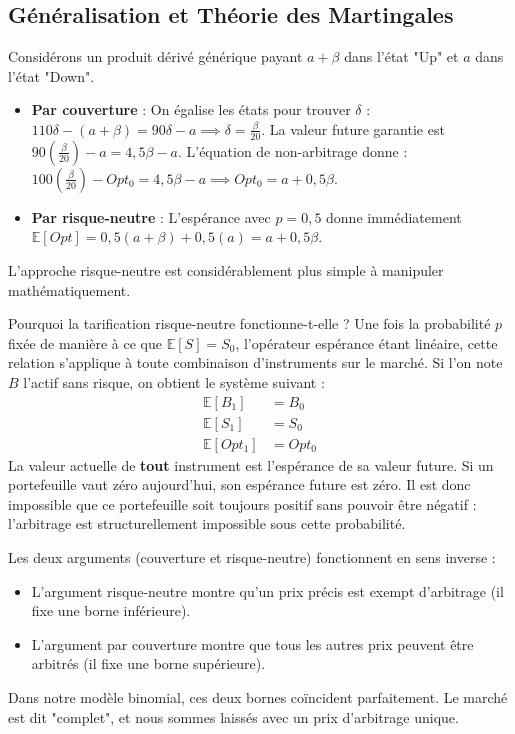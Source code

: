 \subsection{Généralisation et Théorie des Martingales}

\begin{examplebox}
Considérons un produit dérivé générique payant $a + \beta$ dans l'état "Up" et $a$ dans l'état "Down".
\begin{itemize}[label=$\rightarrow$]
    \item \textbf{Par couverture} : On égalise les états pour trouver $\delta$ : $110\delta - (a + \beta) = 90\delta - a \implies \delta = \frac{\beta}{20}$. La valeur future garantie est $90(\frac{\beta}{20}) - a = 4,5\beta - a$. L'équation de non-arbitrage donne : $100(\frac{\beta}{20}) - Opt_0 = 4,5\beta - a \implies Opt_0 = a + 0,5\beta$.
    \item \textbf{Par risque-neutre} : L'espérance avec $p=0,5$ donne immédiatement $\mathbb{E}[Opt] = 0,5(a + \beta) + 0,5(a) = a + 0,5\beta$.
\end{itemize}
L'approche risque-neutre est considérablement plus simple à manipuler mathématiquement.
\end{examplebox}

\begin{theorembox}
Pourquoi la tarification risque-neutre fonctionne-t-elle ? Une fois la probabilité $p$ fixée de manière à ce que $\mathbb{E}[S] = S_0$, l'opérateur espérance étant linéaire, cette relation s'applique à toute combinaison d'instruments sur le marché.
Si l'on note $B$ l'actif sans risque, on obtient le système suivant :
\begin{align*}
    \mathbb{E}[B_1] &= B_0 \\
    \mathbb{E}[S_1] &= S_0 \\
    \mathbb{E}[Opt_1] &= Opt_0
\end{align*}
La valeur actuelle de \textbf{tout} instrument est l'espérance de sa valeur future. Si un portefeuille vaut zéro aujourd'hui, son espérance future est zéro. Il est donc impossible que ce portefeuille soit toujours positif sans pouvoir être négatif : l'arbitrage est structurellement impossible sous cette probabilité.
\end{theorembox}

\begin{remarquebox}
Les deux arguments (couverture et risque-neutre) fonctionnent en sens inverse :
\begin{itemize}[label=$\rightarrow$]
    \item L'argument risque-neutre montre qu'un prix précis est exempt d'arbitrage (il fixe une borne inférieure).
    \item L'argument par couverture montre que tous les autres prix peuvent être arbitrés (il fixe une borne supérieure).
\end{itemize}
Dans notre modèle binomial, ces deux bornes coïncident parfaitement. Le marché est dit "complet", et nous sommes laissés avec un prix d'arbitrage unique.
\end{remarquebox}


